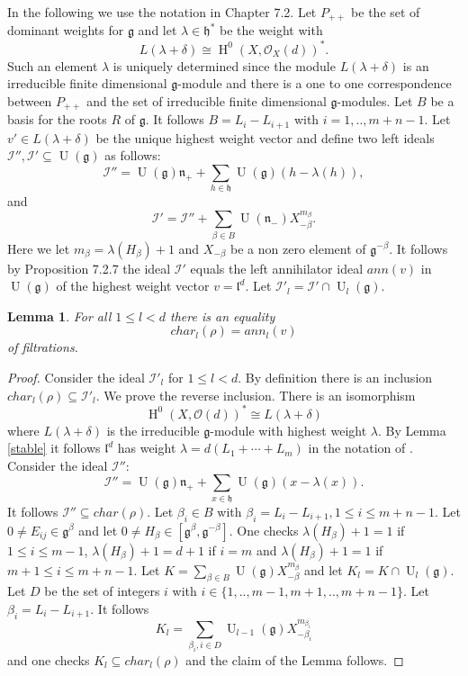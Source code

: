 \documentclass{amsart}
\theoremstyle{plain}
\newtheorem{lemma}[theorem]{Lemma}
\theoremstyle{definition}
\theoremstyle{remark}
\numberwithin{equation}{theorem}
\begin{document}
In the following we use the notation in \cite{dixmier} Chapter 7.2. Let $P_{++}$ be the
set of dominant weights for ${\mathfrak{g}}$ and let $\lambda\in {\mathfrak{h}}^*$ be the
weight with
\[ L(\lambda+\delta)\cong {\operatorname{H} }^0(X,{\mathcal{O} }_X(d))^*.\]
Such an element $\lambda$ is uniquely determined since the module
$L(\lambda+\delta)$ is an irreducible finite dimensional ${\mathfrak{g}}$-module
and there is a one to one correspondence between $P_{++}$ and the set
of irreducible finite dimensional ${\mathfrak{g}}$-modules. Let $B$ be a basis
for the roots $R$ of ${\mathfrak{g}}$. It follows $B=L_i-L_{i+1}$ with
$i=1,..,m+n-1$.
Let $v'\in
L(\lambda+\delta)$ be the unique highest weight vector and define two
left ideals ${\mathcal{I}}'',{\mathcal{I}}'\subseteq{\operatorname{U}}({\mathfrak{g}})$ as follows:
\[ {\mathcal{I}}''={\operatorname{U}}({\mathfrak{g}}){\mathfrak{n}_{+}}+\sum_{h\in {\mathfrak{h}}}{\operatorname{U}}({\mathfrak{g}})(h-\lambda(h)), \]
and
\[ {\mathcal{I}}'={\mathcal{I}}''+\sum_{\beta\in B}{\operatorname{U}}({\mathfrak{n}_{-}})X^{m_\beta}_{-\beta}.\]
Here we let $m_\beta=\lambda(H_\beta)+1$ and $X_{-\beta}$ be a non
zero
element of ${\mathfrak{g}}^{-\beta}$. It follows by \cite{dixmier} Proposition
7.2.7 the ideal ${\mathcal{I}}'$ equals the left annihilator ideal $ann(v)$ in ${\operatorname{U}}({\mathfrak{g}})$ of the
highest weight vector $v={\mathfrak{l}}^d$. Let ${\mathcal{I}}'_l={\mathcal{I}}'\cap {\operatorname{U}}_l({\mathfrak{g}})$.

\begin{lemma} \label{ideals}For all $1\leq l < d$ there is an
  equality
 \[ char_l(\rho)=ann_l(v) \]
of filtrations.
\end{lemma}
\begin{proof} Consider the ideal ${\mathcal{I}}'_l$ for $1\leq l <d$. By
  definition there is an inclusion $char_l(\rho) \subseteq {\mathcal{I}}'_l$. We prove
  the reverse inclusion. There is an isomorphism
\[ {\operatorname{H} }^0(X,{\mathcal{O} }(d))^*\cong L(\lambda+\delta) \]
where $L(\lambda+\delta)$ is the irreducible ${\mathfrak{g}}$-module with highest
weight $\lambda$. By Lemma \ref{stable} it follows
${\mathfrak{l}}^d$ has weight $\lambda=d(L_1+\cdots +L_m)$ in the notation of
\cite{fulton}.
Consider the ideal ${\mathcal{I}}''$:
\[ {\mathcal{I}}''={\operatorname{U}}({\mathfrak{g}}){\mathfrak{n}_{+}}+\sum_{x\in {\mathfrak{h}}}{\operatorname{U}}({\mathfrak{g}})(x-\lambda(x)).\]
It follows ${\mathcal{I}}''\subseteq char(\rho)$.
Let $\beta_i\in B$ with $\beta_i=L_i-L_{i+1}, 1\leq i\leq m+n-1$.
Let $0\neq E_{ij}\in {\mathfrak{g}}^{\beta}$ and let
$0\neq H_\beta \in [ {\mathfrak{g}}^{\beta}, {\mathfrak{g}}^{-\beta} ]$. One checks 
$ \lambda(H_\beta)+1=1$ if $1\leq i \leq m-1$,
$\lambda(H_\beta)+1=d+1$ if $i= m$ and
$\lambda(H_\beta)+1=1$ if $m+1\leq  i\leq m+n-1$.
Let $K=\sum_{\beta \in B}{\operatorname{U}}({\mathfrak{g}})X^{m_\beta}_{-\beta}$ and let
$K_l=K\cap {\operatorname{U}}_l({\mathfrak{g}})$. Let $D$ be the set of integers $i$ with
$i\in \{1,..,m-1,m+1,..,m+n-1\}$. Let $\beta_i=L_i-L_{i+1}$.
It follows 
\[ K_l=\sum_{\beta_i,i\in D}{\operatorname{U}}_{l-1}({\mathfrak{g}})X^{m_{\beta_i}}_{-\beta_i} \]
and one checks  $K_l\subseteq char_l(\rho)$ and the claim of the
Lemma follows.
\end{proof}
\end{document}
